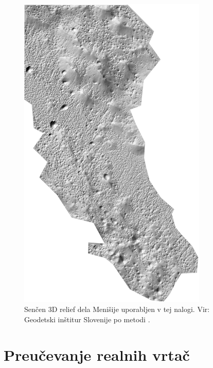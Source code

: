 \documentclass[a4paper, twoside, 12pt]{book}
\begin{document}
        \begin{figure}[h]
          \begin{center}
            \includegraphics[width=9cm]{slike/menisija-relief}
          \end{center}
          \caption{Senčen 3D relief dela Menišije uporabljen v tej nalogi. Vir: Geodetski inštitur Slovenije \cite{LAK} po metodi \cite{Kobler20079}.}
          \label{fig:menisija-relief}
        \end{figure}

        \chapter{Preučevanje realnih vrtač}
        \label{realne-vrtace}
\end{document}

